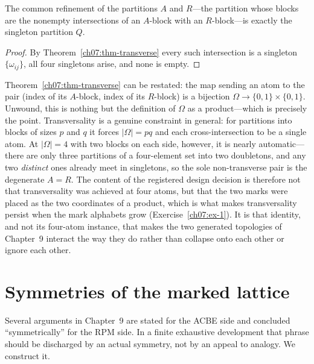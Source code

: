 \begin{corollary}\label{ch07:cor-common-refinement}
The common refinement of the partitions $A$ and $R$---the partition whose blocks are the nonempty intersections of an $A$-block with an $R$-block---is exactly the singleton partition $Q$.
\end{corollary}

\begin{proof}
By Theorem~\ref{ch07:thm-transverse} every such intersection is a singleton $\{\omega_{ij}\}$, all four singletons arise, and none is empty.
\end{proof}

\begin{remark}\label{ch07:rem-bijection}
Theorem~\ref{ch07:thm-transverse} can be restated: the map sending an atom to the pair (index of its $A$-block, index of its $R$-block) is a bijection $\Omega\to\{0,1\}\times\{0,1\}$. Unwound, this is nothing but the definition of $\Omega$ as a product---which is precisely the point. Transversality is a genuine constraint in general: for partitions into blocks of sizes $p$ and $q$ it forces $|\Omega|=pq$ and each cross-intersection to be a single atom. At $|\Omega|=4$ with two blocks on each side, however, it is nearly automatic---there are only three partitions of a four-element set into two doubletons, and any two \emph{distinct} ones already meet in singletons, so the sole non-transverse pair is the degenerate $A=R$. The content of the registered design decision is therefore not that transversality was achieved at four atoms, but that the two marks were placed as the two coordinates of a product, which is what makes transversality persist when the mark alphabets grow (Exercise~\ref{ch07:ex-1}). It is that identity, and not its four-atom instance, that makes the two generated topologies of Chapter~9 interact the way they do rather than collapse onto each other or ignore each other.
\end{remark}

\section{Symmetries of the marked lattice}\label{ch07:sec-symmetry}

Several arguments in Chapter~9 are stated for the ACBE side and concluded ``symmetrically'' for the RPM side. In a finite exhaustive development that phrase should be discharged by an actual symmetry, not by an appeal to analogy. We construct it.

